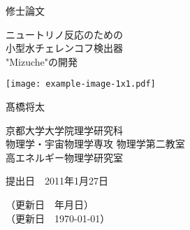 \documentclass[draft]{ltjsreport}
\begin{document}
\begin{titlepage}

    \centering

    \begingroup
    \Large
    修士論文
    \endgroup

    \vspace{1cm}

    \begingroup
    \Huge
    ニュートリノ反応のための\\
    小型水チェレンコフ検出器\\ [0.4cm]
    "Mizuche"の開発
    \endgroup

    \vspace{1cm}

    \begingroup
    \texttt{[image: example-image-1x1.pdf]}
    \endgroup

    \vspace{1cm}

    \begingroup
    \Large
    髙橋将太
    \endgroup

    \vspace{1cm}

    \begingroup
    \large
    京都大学大学院理学研究科\\
    物理学・宇宙物理学専攻 物理学第二教室\\
    高エネルギー物理学研究室
    \endgroup

    \vspace{1cm}
    
    \begingroup
    提出日　2011年1月27日\\
    \endgroup

    \begingroup
    （更新日　\the\year 年\the\month 月\the\day 日）\\
    （更新日　\today）
    \endgroup


\end{titlepage}




\tableofcontents
















%
%
\end{document}
